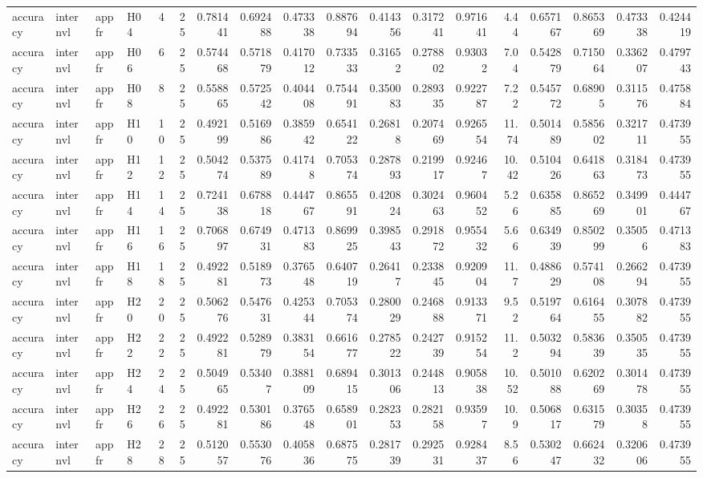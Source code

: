 \begin{longtable}{llllrrrrrrrrrrrrrr}
accuracy & internvl & appfr & H04 & 4 & 25 & 0.781441 & 0.692488 & 0.473338 & 0.887694 & 0.414356 & 0.317241 & 0.971641 & 4.44 & 0.657167 & 0.865369 & 0.473338 & 0.424419 \\
accuracy & internvl & appfr & H06 & 6 & 25 & 0.574468 & 0.571879 & 0.417012 & 0.733533 & 0.31652 & 0.278802 & 0.93032 & 7.04 & 0.542879 & 0.715064 & 0.336207 & 0.479743 \\
accuracy & internvl & appfr & H08 & 8 & 25 & 0.558865 & 0.572542 & 0.404408 & 0.754491 & 0.350083 & 0.289335 & 0.922787 & 7.22 & 0.545772 & 0.68905 & 0.311576 & 0.475884 \\
accuracy & internvl & appfr & H10 & 10 & 25 & 0.492199 & 0.516986 & 0.385942 & 0.654122 & 0.26818 & 0.207469 & 0.926554 & 11.74 & 0.501489 & 0.585602 & 0.321711 & 0.473955 \\
accuracy & internvl & appfr & H12 & 12 & 25 & 0.504274 & 0.537589 & 0.41748 & 0.705374 & 0.287893 & 0.219917 & 0.92467 & 10.42 & 0.510426 & 0.641863 & 0.318473 & 0.473955 \\
accuracy & internvl & appfr & H14 & 14 & 25 & 0.724138 & 0.678818 & 0.444767 & 0.865591 & 0.420824 & 0.302463 & 0.960452 & 5.26 & 0.635885 & 0.865269 & 0.349901 & 0.444767 \\
accuracy & internvl & appfr & H16 & 16 & 25 & 0.706897 & 0.674931 & 0.471383 & 0.869925 & 0.398543 & 0.291872 & 0.955432 & 5.66 & 0.634939 & 0.850299 & 0.35056 & 0.471383 \\
accuracy & internvl & appfr & H18 & 18 & 25 & 0.492281 & 0.518973 & 0.376548 & 0.640719 & 0.26417 & 0.233845 & 0.920904 & 11.7 & 0.488629 & 0.574108 & 0.266294 & 0.473955 \\
accuracy & internvl & appfr & H20 & 20 & 25 & 0.506276 & 0.547631 & 0.425344 & 0.705374 & 0.280029 & 0.246888 & 0.913371 & 9.52 & 0.519764 & 0.616455 & 0.307882 & 0.473955 \\
accuracy & internvl & appfr & H22 & 22 & 25 & 0.492281 & 0.528979 & 0.383154 & 0.661677 & 0.278522 & 0.242739 & 0.915254 & 11.2 & 0.503294 & 0.583639 & 0.350535 & 0.473955 \\
accuracy & internvl & appfr & H24 & 24 & 25 & 0.504965 & 0.53407 & 0.388109 & 0.689415 & 0.301306 & 0.244813 & 0.905838 & 10.52 & 0.501088 & 0.620269 & 0.301478 & 0.473955 \\
accuracy & internvl & appfr & H26 & 26 & 25 & 0.492281 & 0.530186 & 0.376548 & 0.658901 & 0.282353 & 0.282158 & 0.93597 & 10.9 & 0.506817 & 0.631579 & 0.30358 & 0.473955 \\
accuracy & internvl & appfr & H28 & 28 & 25 & 0.512057 & 0.553076 & 0.405836 & 0.687575 & 0.281739 & 0.292531 & 0.928437 & 8.56 & 0.530247 & 0.662432 & 0.320606 & 0.473955 \\

\end{longtable}
